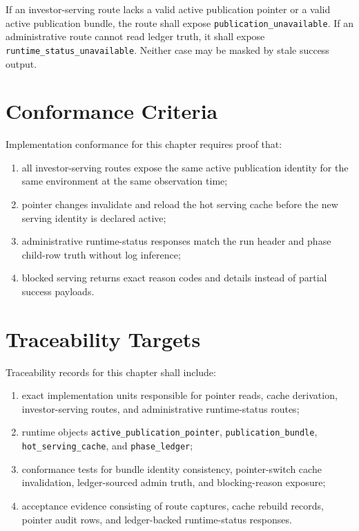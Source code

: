 If an investor-serving route lacks a valid active publication pointer or a valid active publication bundle, the route shall expose \texttt{publication\_unavailable}. If an administrative route cannot read ledger truth, it shall expose \texttt{runtime\_status\_unavailable}. Neither case may be masked by stale success output.

\section{Conformance Criteria}
Implementation conformance for this chapter requires proof that:
\begin{enumerate}[leftmargin=1.2cm]
    \item all investor-serving routes expose the same active publication identity for the same environment at the same observation time;
    \item pointer changes invalidate and reload the hot serving cache before the new serving identity is declared active;
    \item administrative runtime-status responses match the run header and phase child-row truth without log inference;
    \item blocked serving returns exact reason codes and details instead of partial success payloads.
\end{enumerate}

\section{Traceability Targets}
Traceability records for this chapter shall include:
\begin{enumerate}[leftmargin=1.2cm]
    \item exact implementation units responsible for pointer reads, cache derivation, investor-serving routes, and administrative runtime-status routes;
    \item runtime objects \texttt{active\_publication\_pointer}, \texttt{publication\_bundle}, \texttt{hot\_serving\_cache}, and \texttt{phase\_ledger};
    \item conformance tests for bundle identity consistency, pointer-switch cache invalidation, ledger-sourced admin truth, and blocking-reason exposure;
    \item acceptance evidence consisting of route captures, cache rebuild records, pointer audit rows, and ledger-backed runtime-status responses.
\end{enumerate}
